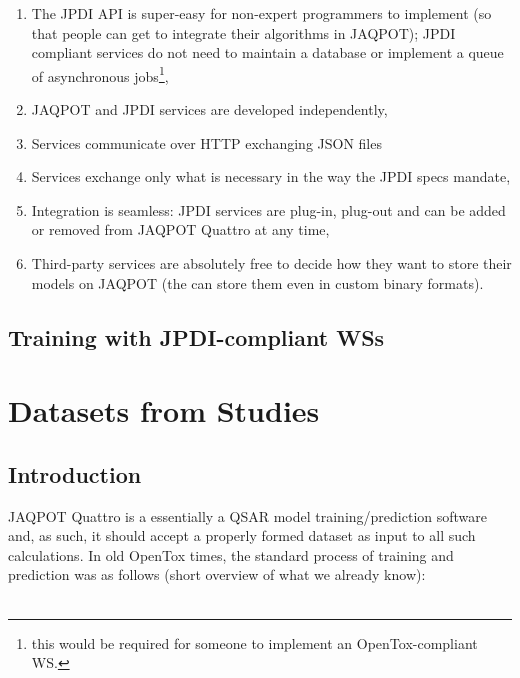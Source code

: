 \begin{enumerate}
 \item The JPDI API is super-easy for non-expert programmers to 
 implement (so that people can get to integrate their algorithms in
 JAQPOT); JPDI compliant services do not need to maintain a database
 or implement a queue of asynchronous jobs\footnote{this would be
 required for someone to implement an OpenTox-compliant WS.},
 \item JAQPOT and JPDI services are developed independently,
 \item Services communicate over HTTP exchanging JSON files
 \item Services exchange only what is necessary in the way the JPDI
 specs mandate,
 \item Integration is seamless: JPDI services are plug-in, plug-out 
 and can be added or removed from JAQPOT Quattro at any time,
 \item Third-party services are absolutely free to decide how they
 want to store their models on JAQPOT (the can store them even in 
 custom binary formats).
\end{enumerate}


\section{Training with JPDI-compliant WSs}




\chapter{Datasets from Studies}

\section{Introduction}
JAQPOT Quattro is a essentially a QSAR model training/prediction software and, 
as such, it should accept a properly formed dataset as input to all 
such calculations. In old OpenTox times, the standard process of training 
and prediction was as follows (short overview of what we already know):\\\\

